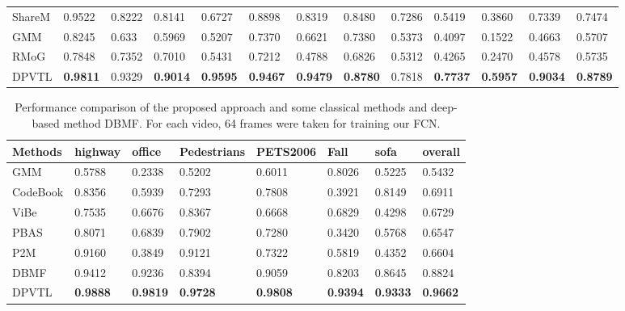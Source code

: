 \documentclass[journal]{IEEEtran}
\begin{document}
\begin{table}[!t]
\begin{tabular}{lllllllllllll}
ShareM\cite{2015_ICME_ShareModel}      & 0.9522   & 0.8222  & 0.8141     & 0.6727    & 0.8898 & 0.8319  & 0.8480   & 0.7286     & 0.5419     & 0.3860 & 0.7339  & 0.7474  \\
GMM\cite{Zivkovic2004}         & 0.8245   & 0.633   & 0.5969     & 0.5207    & 0.7370 & 0.6621  & 0.7380   & 0.5373     & 0.4097     & 0.1522 & 0.4663  & 0.5707  \\
RMoG\cite{Varadarajan2013}        & 0.7848   & 0.7352  & 0.7010     & 0.5431    & 0.7212 & 0.4788  & 0.6826   & 0.5312     & 0.4265     & 0.2470 & 0.4578  & 0.5735  \\ \hline
DPVTL        & \textbf{0.9811}   & 0.9329  & \textbf{0.9014}     & \textbf{0.9595}    & \textbf{0.9467} & \textbf{0.9479}  & \textbf{0.8780}   & 0.7818     & \textbf{0.7737}     & \textbf{0.5957} & \textbf{0.9034}  & \textbf{0.8789} \\ \hline
\end{tabular}
\end{table}

\begin{table}[!t]
\centering
\caption{Performance comparison of the proposed approach and some classical methods and deep-based method DBMF. For each video, 64 frames were taken for training our FCN.}
\label{tab2}
\begin{tabular}{llllllll}
\hline
Methods  & highway & office & Pedestrians & PETS2006 & Fall   & sofa   & overall \\ \hline
GMM\cite{Stauffer1999}      & 0.5788  & 0.2338 & 0.5202      & 0.6011   & 0.8026 & 0.5225 & 0.5432  \\
CodeBook\cite{WU2010739} & 0.8356  & 0.5939 & 0.7293      & 0.7808   & 0.3921 & 0.8149 & 0.6911  \\
ViBe\cite{Barnich2011_2011_TIP}     & 0.7535  & 0.6676 & 0.8367      & 0.6668   & 0.6829 & 0.4298 & 0.6729  \\
PBAS\cite{Hofmann2012Background}     & 0.8071  & 0.6839 & 0.7902      & 0.7280   & 0.3420 & 0.5768 & 0.6547  \\
P2M\cite{Yang2016P2M}      & 0.9160  & 0.3849 & 0.9121      & 0.7322   & 0.5819 & 0.4352 & 0.6604  \\
DBMF\cite{Yang2018DBMF}     & 0.9412  & 0.9236 & 0.8394      & 0.9059   & 0.8203 & 0.8645 & 0.8824  \\ \hline
DPVTL     & \textbf{0.9888}  & \textbf{0.9819} & \textbf{0.9728}      & \textbf{0.9808}   & \textbf{0.9394} & \textbf{0.9333} & \textbf{0.9662}  \\ \hline
\end{tabular}
\end{table}
\end{document}
